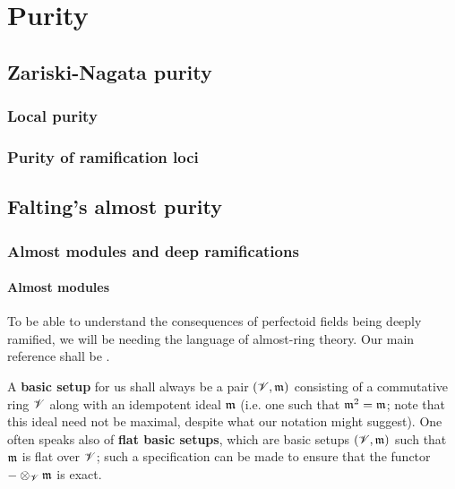 \chapter{Purity}
    \begin{abstract}
        
    \end{abstract}
    
    \minitoc
    
    \section{Zariski-Nagata purity}
        \subsection{Local purity}
        
        \subsection{Purity of ramification loci}
    
    \section{Falting's almost purity}
        \subsection{Almost modules and deep ramifications}
            \subsubsection{Almost modules}
                To be able to understand the consequences of perfectoid fields being deeply ramified, we will be needing the language of almost-ring theory. Our main reference shall be \cite[Chapter 14]{gabber_ramero_almost_ring_theory}.
                
                \begin{convention} \label{conv: basic_setups}
                    A \textbf{basic setup} for us shall always be a pair $(\mathscr{V}, \mathfrak{m})$ consisting of a commutative ring $\mathscr{V}$ along with an idempotent ideal $\mathfrak{m}$ (i.e. one such that $\mathfrak{m}^2 = \mathfrak{m}$; note that this ideal need not be maximal, despite what our notation might suggest). One often speaks also of \textbf{flat basic setups}, which are basic setups $(\mathscr{V}, \mathfrak{m})$ such that $\mathfrak{m}$ is flat over $\mathscr{V}$; such a specification can be made to ensure that the functor $- \tensor_{\scrV} \m$ is exact.
                \end{convention}
                
